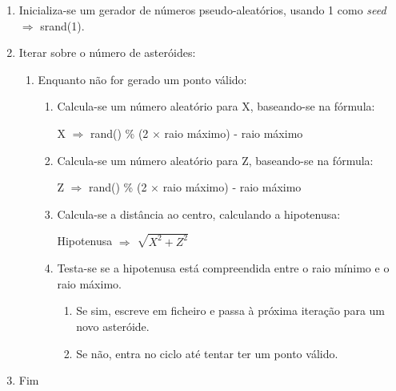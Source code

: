 \documentclass[a4paper]{article}
\begin{document}
 \ttfamily
\begin{enumerate}
  \item Inicializa-se um gerador de números pseudo-aleatórios, usando 1 como \emph{seed} $\Rightarrow$ srand(1).
  \item Iterar sobre o número de asteróides:
  \begin{enumerate}
    \item Enquanto não for gerado um ponto válido:
    \begin{enumerate}
    	\item Calcula-se um número aleatório para X, baseando-se na fórmula:
	
	 \vspace{0.5cm}
	
	 \hspace{0.0cm} X $\Rightarrow$ rand() \% (2 $\times$ raio máximo) - raio máximo
	 
	 \vspace{0.5cm}
	 
	 \item Calcula-se um número aleatório para Z, baseando-se na fórmula:
	 
	 \vspace{0.5cm}
	
	 \hspace{0.0cm} Z $\Rightarrow$ rand() \% (2 $\times$ raio máximo) - raio máximo
	 
	 \vspace{0.5cm}
	 
	 \item Calcula-se a distância ao centro, calculando a hipotenusa:
	 
	 \vspace{0.5cm}
	
	 \hspace{0.0cm} Hipotenusa $\Rightarrow$ $\sqrt{X^2 + Z^2}$
	 
	 \vspace{0.5cm}
	 
	 \item Testa-se se a hipotenusa está compreendida entre o raio mínimo e o raio máximo.
	 \begin{enumerate}
	 \item Se sim, escreve em ficheiro e passa à próxima iteração para um novo asteróide.
	 \item Se não, entra no ciclo até tentar ter um ponto válido.
	 \end{enumerate}
	 
    \end{enumerate}

    \end{enumerate}

    \item Fim
    \end{enumerate}
    \rmfamily
    
\end{document}
